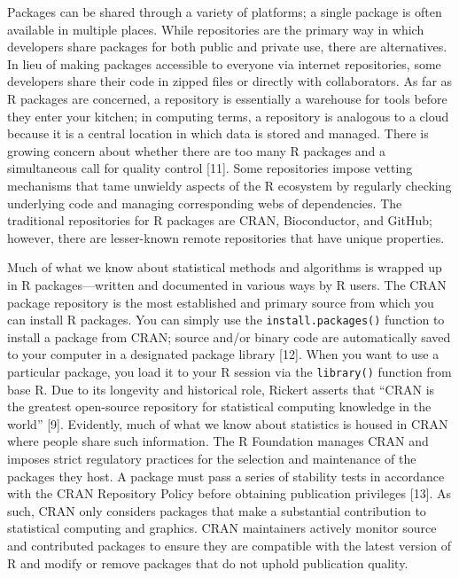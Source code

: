 \documentclass[10pt,letterpaper]{article}
\begin{document}
Packages can be shared through a variety of platforms; a single package
is often available in multiple places. While repositories are the
primary way in which developers share packages for both public and
private use, there are alternatives. In lieu of making packages
accessible to everyone via internet repositories, some developers share
their code in zipped files or directly with collaborators. As far as R
packages are concerned, a repository is essentially a warehouse for
tools before they enter your kitchen; in computing terms, a repository
is analogous to a cloud because it is a central location in which data
is stored and managed. There is growing concern about whether there are
too many R packages and a simultaneous call for quality control
{[}11{]}. Some repositories impose vetting mechanisms that tame unwieldy
aspects of the R ecosystem by regularly checking underlying code and
managing corresponding webs of dependencies. The traditional
repositories for R packages are CRAN, Bioconductor, and GitHub; however,
there are lesser-known remote repositories that have unique properties.

Much of what we know about statistical methods and algorithms is wrapped
up in R packages---written and documented in various ways by R users.
The CRAN package repository is the most established and primary source
from which you can install R packages. You can simply use the
\texttt{install.packages()} function to install a package from CRAN;
source and/or binary code are automatically saved to your computer in a
designated package library {[}12{]}. When you want to use a particular
package, you load it to your R session via the \texttt{library()}
function from base R. Due to its longevity and historical role, Rickert
asserts that ``CRAN is the greatest open-source repository for
statistical computing knowledge in the world'' {[}9{]}. Evidently, much
of what we know about statistics is housed in CRAN where people share
such information. The R Foundation manages CRAN and imposes strict
regulatory practices for the selection and maintenance of the packages
they host. A package must pass a series of stability tests in accordance
with the CRAN Repository Policy before obtaining publication privileges
{[}13{]}. As such, CRAN only considers packages that make a substantial
contribution to statistical computing and graphics. CRAN maintainers
actively monitor source and contributed packages to ensure they are
compatible with the latest version of R and modify or remove packages
that do not uphold publication quality.
\end{document}
